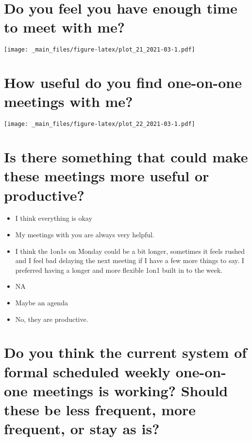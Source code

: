 \documentclass[
]{book}
\providecommand{\tightlist}{%
  \setlength{\itemsep}{0pt}\setlength{\parskip}{0pt}}
\begin{document}
\hypertarget{do-you-feel-you-have-enough-time-to-meet-with-me-1}{%
\section{Do you feel you have enough time to meet with me?}\label{do-you-feel-you-have-enough-time-to-meet-with-me-1}}

\texttt{[image: \_main\_files/figure-latex/plot\_21\_2021-03-1.pdf]}

\hypertarget{how-useful-do-you-find-one-on-one-meetings-with-me-1}{%
\section{How useful do you find one-on-one meetings with me?}\label{how-useful-do-you-find-one-on-one-meetings-with-me-1}}

\texttt{[image: \_main\_files/figure-latex/plot\_22\_2021-03-1.pdf]}

\hypertarget{is-there-something-that-could-make-these-meetings-more-useful-or-productive-1}{%
\section{Is there something that could make these meetings more useful or productive?}\label{is-there-something-that-could-make-these-meetings-more-useful-or-productive-1}}

\begin{itemize}
\tightlist
\item
  I think everything is okay
\item
  My meetings with you are always very helpful.
\item
  I think the 1on1s on Monday could be a bit longer, sometimes it feels rushed and I feel bad delaying the next meeting if I have a few more things to say. I preferred having a longer and more flexible 1on1 built in to the week.
\item
  NA
\item
  Maybe an agenda
\item
  No, they are productive.
\end{itemize}

\hypertarget{do-you-think-the-current-system-of-formal-scheduled-weekly-one-on-one-meetings-is-working-should-these-be-less-frequent-more-frequent-or-stay-as-is-1}{%
\section{Do you think the current system of formal scheduled weekly one-on-one meetings is working? Should these be less frequent, more frequent, or stay as is?}\label{do-you-think-the-current-system-of-formal-scheduled-weekly-one-on-one-meetings-is-working-should-these-be-less-frequent-more-frequent-or-stay-as-is-1}}
\end{document}
